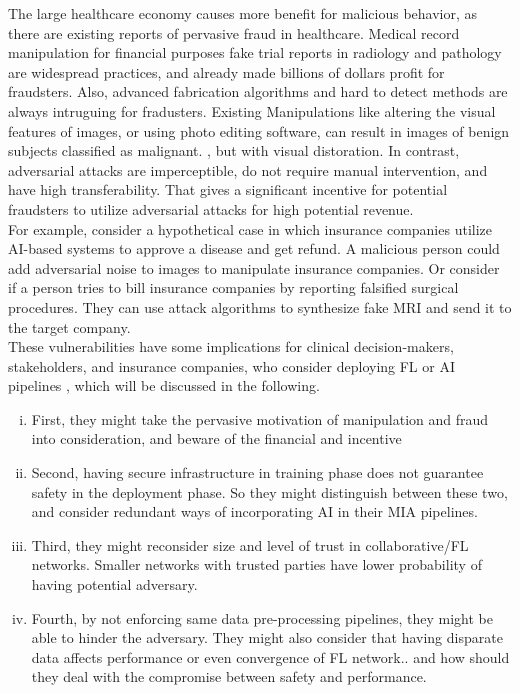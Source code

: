 The large healthcare economy causes more benefit for malicious behavior, as there are existing reports of pervasive fraud in healthcare. Medical record manipulation for financial purposes \cite{ma2021understanding} fake trial reports\cite{george2015data} in radiology \cite{chowdhry2014image} and pathology\cite{suvarna2001histopathology} are widespread practices, and already made billions of dollars profit \cite{graese2016assessing} for fraudsters. Also, advanced fabrication algorithms and hard to detect methods are always intruguing for fradusters. Existing Manipulations like altering the visual features of images, or using photo editing software, \cite{chowdhry2014image} can result in images of benign subjects classified as malignant.\cite{xia2020pseudo}
\cite{sun2020adversarial}, but with visual distoration. In contrast, adversarial attacks are imperceptible, do not require manual intervention, and have high transferability. That gives a significant incentive for potential fraudsters to utilize adversarial attacks for high potential revenue. \\For example, consider a hypothetical case in which insurance companies utilize AI-based systems to approve a disease and get refund. A malicious person could add adversarial noise to images to manipulate insurance companies. Or consider if a person tries to bill insurance companies by reporting falsified surgical procedures. They can use attack algorithms to synthesize fake MRI and send it to the target company.
\\These vulnerabilities have some implications for clinical decision-makers, stakeholders, and insurance companies, who consider deploying FL or AI pipelines , which will be discussed in the following.
 
\begin{enumerate}[(i)]
    \item  First, they might take the pervasive motivation of manipulation and fraud into consideration, and beware of the financial and incentive \cite{finlayson2019adversarial}
    \item Second, having secure infrastructure in training phase does not guarantee safety in the deployment phase. So they might distinguish between these two, and consider redundant ways of incorporating AI in their MIA pipelines.
\item  Third, they might reconsider size and level of trust in collaborative/FL networks. Smaller networks with trusted parties have lower probability of having potential adversary.
\item Fourth, by not enforcing same data pre-processing pipelines, they might be able to hinder the adversary. They might also consider that having disparate data affects performance or even convergence of FL network.\cite{li2019convergence}. and how should they deal with the compromise between safety and performance.
\end{enumerate}


